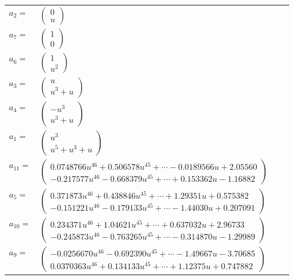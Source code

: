 \documentclass[1p]{elsarticle_modified}
\theoremstyle{definition}
\begin{document}
\begin{tabular}{m{7pt} m{180pt} m{7pt} m{180pt} }
\flushright $a_{2}=$&$\begin{pmatrix}0\\u\end{pmatrix}$ \\
\flushright $a_{7}=$&$\begin{pmatrix}1\\0\end{pmatrix}$ \\
\flushright $a_{6}=$&$\begin{pmatrix}1\\u^2\end{pmatrix}$ \\
\flushright $a_{3}=$&$\begin{pmatrix}u\\u^3+u\end{pmatrix}$ \\
\flushright $a_{4}=$&$\begin{pmatrix}- u^3\\u^3+u\end{pmatrix}$ \\
\flushright $a_{1}=$&$\begin{pmatrix}u^3\\u^5+u^3+u\end{pmatrix}$ \\
\flushright $a_{11}=$&$\begin{pmatrix}0.0748766 u^{46}+0.506578 u^{45}+\cdots-0.0189566 u+2.05560\\-0.217577 u^{46}-0.668379 u^{45}+\cdots+0.153362 u-1.16882\end{pmatrix}$ \\
\flushright $a_{5}=$&$\begin{pmatrix}0.371873 u^{46}+0.438846 u^{45}+\cdots+1.29351 u+0.575382\\-0.151221 u^{46}-0.179133 u^{45}+\cdots-1.44030 u+0.207091\end{pmatrix}$ \\
\flushright $a_{10}=$&$\begin{pmatrix}0.234371 u^{46}+1.04621 u^{45}+\cdots+0.637032 u+2.96733\\-0.245873 u^{46}-0.763265 u^{45}+\cdots-0.314870 u-1.29989\end{pmatrix}$ \\
\flushright $a_{9}=$&$\begin{pmatrix}-0.0256670 u^{46}-0.692390 u^{45}+\cdots-1.49667 u-3.70685\\0.0370363 u^{46}+0.134133 u^{45}+\cdots+1.12375 u+0.747882\end{pmatrix}$ \\

\end{tabular}
\end{document}
